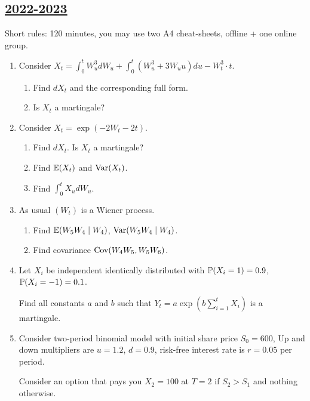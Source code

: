 \subsection[2022-2023]{\hyperref[sec:sol_kr_02_2022_2023]{2022-2023}}
\label{sec:kr_02_2022_2023} %



Short rules: 120 minutes, you may use two A4 cheat-sheets, offline + one online group.

\begin{enumerate}

\item Consider $X_t = \int_0^t W_u^3 dW_u + \int_0^t (W_u^3 + 3W_u u ) du - W_t^3 \cdot t$.

\begin{enumerate}
    \item Find $dX_t$ and the corresponding full form. 
    \item Is $X_t$ a martingale?
\end{enumerate}

\item Consider $X_t = \exp(-2W_t - 2t)$.
\begin{enumerate}
    \item Find $dX_t$. Is $X_t$ a martingale?
    \item Find $\E(X_t)$ and $\Var(X_t)$.
    \item Find $\int_0^t X_u dW_u$.
\end{enumerate}

\item As usual $(W_t)$ is a Wiener process.
\begin{enumerate}
    \item Find $\E(W_5 W_4 \mid W_4)$, $\Var(W_5 W_4 \mid W_4)$.
    \item Find covariance $\Cov(W_4 W_5, W_5 W_6)$.
\end{enumerate}

\item Let $X_i$ be independent identically distributed with $\P(X_i = 1) = 0.9$, $\P(X_i = -1 ) = 0.1$. 

Find all constants $a$ and $b$ such that $Y_t = a \exp\left(b\sum_{i=1}^t X_i\right)$ is a martingale. 

\item Consider two-period binomial model with initial share price $S_0 = 600$, 
Up and down multipliers are $u=1.2$, $d=0.9$, risk-free interest rate is $r = 0.05$ per period. 

Consider an option that pays you $X_2 = 100$ at $T=2$ if $S_2 > S_1$ and nothing otherwise. 


\end{enumerate}
